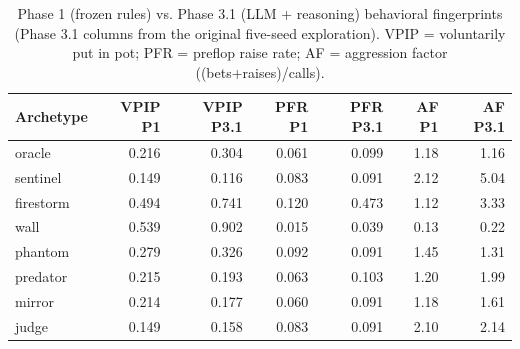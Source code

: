\begin{table}[ht]
\centering
\small
\begin{tabular}{lrrrrrr}
\hline
Archetype & VPIP P1 & VPIP P3.1 & PFR P1 & PFR P3.1 & AF P1 & AF P3.1 \\
\hline
oracle & 0.216 & 0.304 & 0.061 & 0.099 & 1.18 & 1.16 \\
sentinel & 0.149 & 0.116 & 0.083 & 0.091 & 2.12 & 5.04 \\
firestorm & 0.494 & 0.741 & 0.120 & 0.473 & 1.12 & 3.33 \\
wall & 0.539 & 0.902 & 0.015 & 0.039 & 0.13 & 0.22 \\
phantom & 0.279 & 0.326 & 0.092 & 0.091 & 1.45 & 1.31 \\
predator & 0.215 & 0.193 & 0.063 & 0.103 & 1.20 & 1.99 \\
mirror & 0.214 & 0.177 & 0.060 & 0.091 & 1.18 & 1.61 \\
judge & 0.149 & 0.158 & 0.083 & 0.091 & 2.10 & 2.14 \\
\hline
\end{tabular}
\caption{Phase 1 (frozen rules) vs. Phase 3.1 (LLM + reasoning) behavioral fingerprints (Phase 3.1 columns from the original five-seed exploration). VPIP = voluntarily put in pot; PFR = preflop raise rate; AF = aggression factor ((bets+raises)/calls).}
\label{tab:behavioral-shift}
\end{table}
